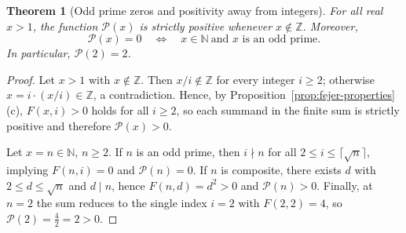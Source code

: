 \documentclass[11pt,a4paper]{amsart}
\theoremstyle{plain}
\newtheorem{theorem}{Theorem}[section]
\theoremstyle{definition}
\theoremstyle{remark}
\begin{document}
\begin{theorem}[Odd prime zeros and positivity away from integers]\label{thm:primezero}
For all real $x>1$, the function $\mathcal P(x)$ is strictly positive whenever $x\notin\mathbb Z$. Moreover,
\[
\mathcal P(x)=0\quad\Longleftrightarrow\quad x\in\mathbb N\ \text{and $x$ is an odd prime}.
\]
In particular, $\mathcal P(2)=2$.
\end{theorem}
\begin{proof}
Let $x>1$ with $x\notin\mathbb Z$. Then $x/i\notin\mathbb Z$ for every integer $i\ge 2$; otherwise $x=i\cdot (x/i)\in\mathbb Z$, a contradiction. Hence, by Proposition~\ref{prop:fejer-properties}(c), $F(x,i)>0$ holds for all $i\ge 2$, so each summand in the finite sum is strictly positive and therefore $\mathcal P(x)>0$.

Let $x=n\in\mathbb N$, $n\ge 2$. If $n$ is an odd prime, then $i\nmid n$ for all $2\le i\le \lceil\sqrt n\rceil$, implying $F(n,i)=0$ and $\mathcal P(n)=0$. If $n$ is composite, there exists $d$ with $2\le d\le \sqrt n$ and $d\mid n$, hence $F(n,d)=d^2>0$ and $\mathcal P(n)>0$. Finally, at $n=2$ the sum reduces to the single index $i=2$ with $F(2,2)=4$, so $\mathcal P(2)=\frac{4}{2}=2>0$.
\end{proof}
\end{document}
